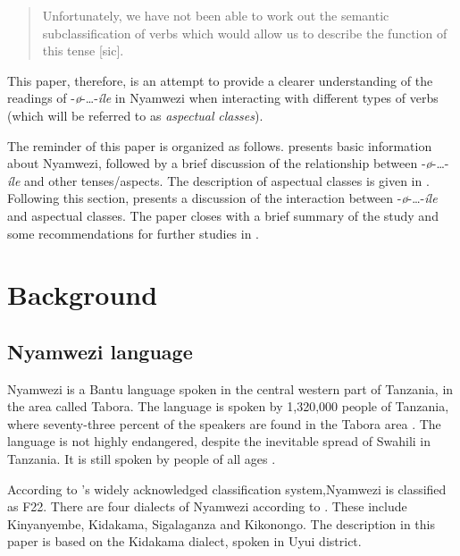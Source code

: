 \documentclass[output=paper,newtxmath,modfonts,nonflat,draftmode]{langsci/langscibook}
\begin{document}
\begin{quote}
Unfortunately, we have not been able to work out the semantic subclassification of verbs which would allow us to describe the function of this tense [sic]. \cite[126]{Maganga1992}
\end{quote}

This paper, therefore, is an attempt to provide a clearer understanding of the readings of -\textit{ø}-…-\textit{íle} in Nyamwezi when interacting with different types of verbs (which will be referred to as \textit{aspectual} \textit{classes}). 

The reminder of this paper is organized as follows.  presents basic information about Nyamwezi, followed by a brief discussion of the relationship between -\textit{ø}-…-\textit{íle} and other tenses/aspects. The description of aspectual classes is given in . Following this section,  presents a discussion of the interaction between -\textit{ø}-…-\textit{íle} and aspectual classes. The paper closes with a brief summary of the study and some recommendations for further studies in . 

 
\section{Background} 
 \label{sec:kanijo:2}
 
\subsection{Nyamwezi language} 

Nyamwezi is a Bantu language spoken in the central western part of Tanzania, in the area called Tabora. The language is spoken by 1,320,000 people of Tanzania, where seventy-three percent of the speakers are found in the Tabora area \citep{Lewis2013}. The language is not highly endangered, despite the inevitable spread of Swahili in Tanzania. It is still spoken by people of all ages \citep{Lewis2013}. 

According to \citeauthor{Guthrie1967}'s \citeyear{Guthrie1967} widely acknowledged classification system,\linebreak Nyamwezi is classified as F22. There are four dialects of Nyamwezi according to \citet{Masele2001}. These include Kinyanyembe, Kidakama, Sigalaganza and Kikonongo. The description in this paper is based on the Kidakama dialect, spoken in Uyui district.
\end{document}
